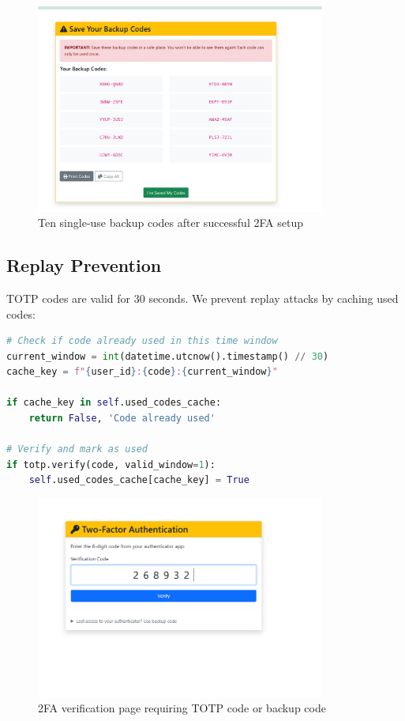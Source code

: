 \documentclass[12pt,a4paper]{article}
\begin{document}
\begin{figure}[H]
    \centering
    \includegraphics[width=0.85\textwidth]{screenshots/backup_codes.png}
    \caption{Ten single-use backup codes after successful 2FA setup}
    \label{fig:backup}
\end{figure}

\subsection{Replay Prevention}

TOTP codes are valid for 30 seconds. We prevent replay attacks by caching used codes:

\begin{lstlisting}[language=Python]
# Check if code already used in this time window
current_window = int(datetime.utcnow().timestamp() // 30)
cache_key = f"{user_id}:{code}:{current_window}"

if cache_key in self.used_codes_cache:
    return False, 'Code already used'

# Verify and mark as used
if totp.verify(code, valid_window=1):
    self.used_codes_cache[cache_key] = True
\end{lstlisting}

\begin{figure}[H]
    \centering
    \includegraphics[width=0.85\textwidth]{screenshots/2fa_login_verification.png}
    \caption{2FA verification page requiring TOTP code or backup code}
    \label{fig:2fa_verify}
\end{figure}
\end{document}
